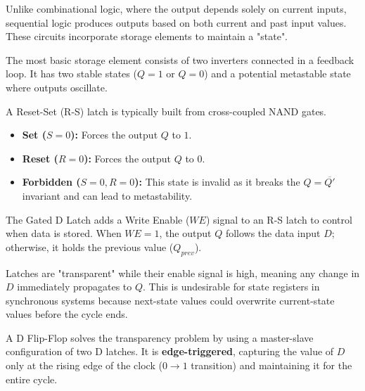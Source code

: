 \begin{definition}
	Unlike combinational logic, where the output depends solely on current inputs, sequential logic produces outputs based on both current and past input values. These circuits incorporate storage elements to maintain a "state".
\end{definition}

\begin{definition}
	The most basic storage element consists of two inverters connected in a feedback loop. It has two stable states ($Q=1$ or $Q=0$) and a potential metastable state where outputs oscillate.
\end{definition}

\begin{definition}
	A Reset-Set (R-S) latch is typically built from cross-coupled NAND gates.
	\begin{itemize}
		\item \textbf{Set ($S=0$):} Forces the output $Q$ to $1$.
		\item \textbf{Reset ($R=0$):} Forces the output $Q$ to $0$.
		\item \textbf{Forbidden ($S=0, R=0$):} This state is invalid as it breaks the $Q = \overline{Q'}$ invariant and can lead to metastability.
	\end{itemize}
\end{definition}


\begin{definition}
	The Gated D Latch adds a Write Enable ($WE$) signal to an R-S latch to control when data is stored. When $WE=1$, the output $Q$ follows the data input $D$; otherwise, it holds the previous value ($Q_{prev}$).
\end{definition}


\begin{important}
	Latches are "transparent" while their enable signal is high, meaning any change in $D$ immediately propagates to $Q$. This is undesirable for state registers in synchronous systems because next-state values could overwrite current-state values before the cycle ends.
\end{important}

\begin{definition}
	A D Flip-Flop solves the transparency problem by using a master-slave configuration of two D latches. It is \textbf{edge-triggered}, capturing the value of $D$ only at the rising edge of the clock ($0 \rightarrow 1$ transition) and maintaining it for the entire cycle.
\end{definition}


